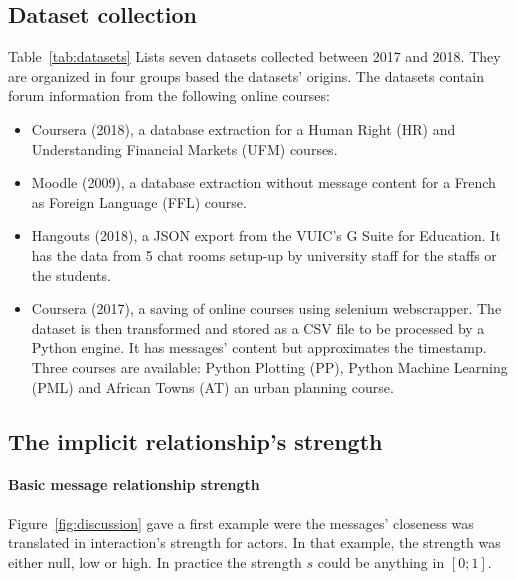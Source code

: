 \documentclass[a4paper,twoside]{article}
\begin{document}
\subsection{Dataset collection}
Table~\ref{tab:datasets} Lists seven datasets collected between 2017 and 2018.  They are organized in four groups based the datasets' origins.
The datasets contain forum information from the following online courses:
\begin{itemize}
\item Coursera (2018), a database extraction for a Human Right (HR) and Understanding Financial Markets (UFM) courses.
\item Moodle (2009), a database extraction without message content for a French as Foreign Language (FFL) course.
\item Hangouts (2018), a JSON export from the VUIC's G Suite for Education.  It has the data from 5 chat rooms setup-up by university staff for the staffs or the students.
\item Coursera (2017), a saving of online courses using selenium webscrapper.  The dataset is then transformed and stored as a CSV file to be processed by a Python engine. It has messages' content but approximates the timestamp.  Three courses are available: Python Plotting (PP), Python Machine Learning (PML) and African Towns (AT) an urban planning course.
\end{itemize}

\subsection{The implicit relationship's strength}
\label{ssec:strength1}

\paragraph{Basic message relationship strength}
Figure~\ref{fig:discussion} gave a first example were the messages' closeness was translated in interaction's strength for actors.  In that example, the strength was either null, low or high.  In practice the strength $s$ could be anything in $[0;1]$.
\end{document}
